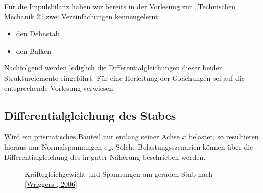 \documentclass[letterpaper,10pt,german]{jupyterBook}
\let\sphinxpxdimen\pdfpxdimen\else\newdimen\sphinxpxdimen
\begin{document}
\sphinxAtStartPar
Für die Impulsbilanz haben wir bereits in der Vorlesung zur „Technischen Mechanik 2“ zwei Vereinfachungen kennengelernt:
\begin{itemize}
\item {} 
\sphinxAtStartPar
den Dehnstab

\item {} 
\sphinxAtStartPar
den Balken

\end{itemize}

\sphinxAtStartPar
Nachfolgend werden lediglich die Differentialgleichungen dieser beiden Strukturelemente eingeführt. Für eine Herleitung der Gleichungen sei auf die entsprechende Vorlesung verwiesen.


\subsection{Differentialgleichung des Stabes}
\label{\detokenize{chapters/chapter1/strukturgleichungen:differentialgleichung-des-stabes}}
\sphinxAtStartPar
Wird ein prismatisches Bauteil nur entlang seiner Achse \(x\) belastet, so resultieren hieraus nur Normalspannungen \(\sigma_x\). Solche Belastungsszenarien können über die Differentialgleichung des  in guter Näherung beschrieben werden.

\begin{figure}[htbp]
\centering
\capstart

\noindent\sphinxincludegraphics[width=600\sphinxpxdimen]{{Stab_TMKompakt}.png}
\caption{Kräftegleichgewicht und Spannungen am geraden Stab nach {[}\hyperlink{cite.quellen:id12}{Wriggers , 2006}{]}}\label{\detokenize{chapters/chapter1/strukturgleichungen:stab}}\end{figure}
\end{document}
